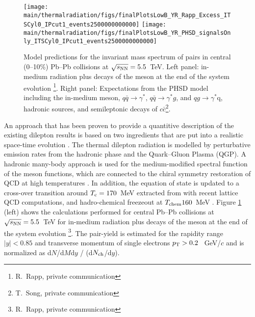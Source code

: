 \documentclass[../report.tex]{subfiles}
\providecommand{\main}{..}
\begin{document}
\begin{figure}[htb]
\centering
\texttt{[image: \\main/thermalradiation/figs/finalPlotsLowB\_YR\_Rapp\_Excess\_ITSCyl0\_IPcut1\_events2500000000000]}
\texttt{[image: \\main/thermalradiation/figs/finalPlotsLowB\_YR\_PHSD\_signalsOnly\_ITSCyl0\_IPcut1\_events2500000000000]}
\caption{Model predictions for the invariant mass spectrum of \Pepem pairs in central (0--10\%) Pb--Pb collisions at $\sqrt{s_{\rm NN}} = 5.5$~TeV. Left panel: in-medium radiation plus decays of the \Prho meson at the end of the system evolution \footnote{R.~Rapp, private communication}. Right panel: Expectations from the PHSD model including the in-medium \Prho meson, $q\bar{q}\rightarrow\gamma^{*}$, $q\bar{q}\rightarrow\gamma^{*}g$, and $qg\rightarrow\gamma^{*}$q, hadronic sources, and semileptonic decays of $c\bar{c}$\footnote{T.~Song, private communication}.}
\label{fig:LHCExpectations_Rapp_pHSD}
\end{figure}

An approach that has been proven to provide a quantitive description of the existing dilepton results \cite{Rapp:2011is} is based on two ingredients that are put into a realistic space-time evolution \cite{Rapp:2000pe}. The thermal dilepton radiation is modelled by perturbative emission rates from the hadronic phase and the Quark--Gluon Plasma (QGP)\cite{vanHees:2007th,Rapp:2009yu}. A hadronic many-body approach \cite{Rapp:1999us} is used for the medium-modified spectral function of the \Prho meson functions, which are connected to the chiral symmetry restoration of QCD at high temperatures \cite{Hohler:2013eba}. In addition, the equation of state is updated to a cross-over transition around $T_{\rm c}=170$~MeV extracted from with recent lattice QCD computations, and hadro-chemical freezeout at $T_{\rm chem}160$~MeV \cite{He:2011zx}. Figure \ref{fig:LHCExpectations_Rapp_pHSD} (left) shows the calculations performed for central Pb--Pb collisions at $\sqrt{s_{\rm NN}}= 5.5$~TeV for in-medium radiation plus decays of the \Prho meson at the end of the system evolution \footnote{R.~Rapp, private communication}. The pair-yield is estimated for the rapidity range $|y|<0.85$ and transverse momentum of single electrons $p_{\rm T}>0.2$~ GeV/$c$ and is normalized as d$N$/d$M$d$y$ / (d$N_{\rm ch}$/d$y$). 
 
\end{document}
